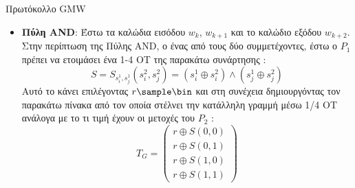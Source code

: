 \documentclass[10pt]{beamer}
\begin{document}
    \begin{frame}{Πρωτόκολλο GMW}
        \begin{block}{}
            \begin{itemize}
                \item \textbf{Πύλη AND}: Έστω τα καλώδια εισόδου $w_k$, $w_{k+1}$ και το καλώδιο εξόδου $w_{k+2}$. Στην περίπτωση της Πύλης AND, ο ένας από τους δύο συμμετέχοντες, έστω ο $P_1$ πρέπει να ετοιμάσει ένα 1-4 ΟΤ της παρακάτω συνάρτησης :
                $$
                S=S_{s_i^1, s_j^1}\left(s_i^2, s_j^2\right)=\left(s_i^1 \oplus s_i^2\right) \wedge\left(s_j^1 \oplus s_j^2\right)
                $$
                Αυτό το κάνει επιλέγοντας $r \sample \bin$ και στη συνέχεια δημιουργόντας τον παρακάτω πίνακα από τον οποία στέλνει την κατάλληλη γραμμή μέσω 1/4 OT ανάλογα με το τι τιμή έχουν οι μετοχές του $P_2$ :
                $$
                T_G=\left(\begin{array}{l}
                              r \oplus S(0,0) \\
                              r \oplus S(0,1) \\
                              r \oplus S(1,0) \\
                              r \oplus S(1,1)
                \end{array}\right)
                $$
            \end{itemize}
        \end{block}
    \end{frame}
\end{document}
